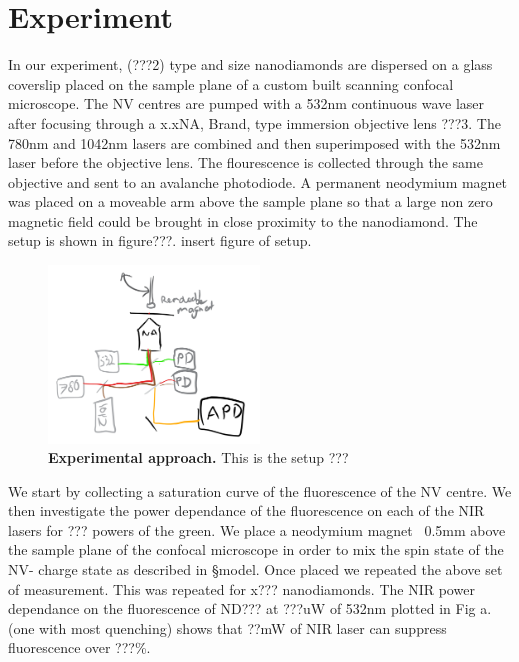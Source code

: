 \documentclass[preprint,prl]{revtex4}
\begin{document}
\section{Experiment}

In our experiment, (???2) type and size nanodiamonds are dispersed on a glass coverslip placed on the sample plane of a custom built scanning confocal microscope. The NV centres are pumped with a 532nm continuous wave laser after focusing through a x.xNA, Brand, type immersion objective lens ???3. The 780nm and 1042nm lasers are combined and then superimposed with the 532nm laser before the objective lens. The flourescence is collected through the same objective and sent to an avalanche photodiode. A permanent neodymium magnet was placed on a moveable arm above the sample plane so that a large non zero magnetic field could be brought in close proximity to the nanodiamond. The setup is shown in figure???. insert figure of setup.

\begin{figure}[t]
  \centering
  \includegraphics[width=0.5\textwidth]{Setup.png} 
 \caption{\textbf{Experimental approach.} This is the setup ???} \label{FigSetup}
\end{figure}

We start by collecting a saturation curve of the fluorescence of the NV centre. We then investigate the power dependance of the fluorescence on each of the NIR lasers for ??? powers of the green. We place a neodymium magnet ~0.5mm above the sample plane of the confocal microscope in order to mix the spin state of the NV- charge state as described in \S model. Once placed we repeated the above set of measurement. This was repeated for x??? nanodiamonds. The NIR power dependance on the fluorescence of ND??? at ???uW of 532nm plotted in Fig a. (one with most quenching) shows that ??mW of NIR laser can suppress fluorescence over ???\%.
\end{document}
